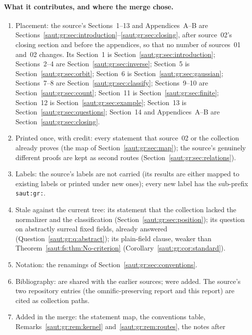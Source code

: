 \documentclass[11pt]{article}
\theoremstyle{definition}
\theoremstyle{remark}
\numberwithin{equation}{section}
\begin{document}
\paragraph{What it contributes, and where the merge chose.}
\begin{enumerate}[label=(\arabic*)]
\item Placement: the source's Sections~1--13 and Appendices~A--B are
Sections~\ref{saut:gr:sec:introduction}--\ref{saut:gr:sec:closing}, after source~02's
closing section and before the appendices, so that no number of sources~01 and~02
changes. Its Section~1 is Section~\ref{saut:gr:sec:introduction}; Sections~2--4 are
Section~\ref{saut:gr:sec:inverse}; Section~5 is Section~\ref{saut:gr:sec:orbit};
Section~6 is Section~\ref{saut:gr:sec:gaussian}; Sections~7--8 are
Section~\ref{saut:gr:sec:classify}; Sections~9--10 are Section~\ref{saut:gr:sec:count};
Section~11 is Section~\ref{saut:gr:sec:finite}; Section~12 is
Section~\ref{saut:gr:sec:example}; Section~13 is Section~\ref{saut:gr:sec:questions};
Section~14 and Appendices~A--B are Section~\ref{saut:gr:sec:closing}.
\item Printed once, with credit: every statement that source~02 or the collection
already proves (the map of Section~\ref{saut:gr:sec:map}); the source's genuinely
different proofs are kept as second routes (Section~\ref{saut:gr:sec:relations}).
\item Labels: the source's labels are not carried (its results are either mapped to
existing labels or printed under new ones); every new label has the sub-prefix
\texttt{saut:gr:}.
\item Stale against the current tree: its statement that the collection lacked the
normalizer and the classification (Section~\ref{saut:gr:sec:position}); its question on
abstractly surreal fixed fields, already answered (Question~\ref{saut:gr:q:abstract}); its
plain-field clause, weaker than Theorem~\ref{saut:fs:thm:No-criterion}
(Corollary~\ref{saut:gr:cor:standard}).
\item Notation: the renamings of Section~\ref{saut:gr:sec:conventions}.
\item Bibliography: \cite{BKKS,KS,KKS,Conrad} are shared with the earlier sources;
\cite{StacksClosure,StacksTranscendence} were added. The source's two repository
entries (the omnific-preserving report and this report) are cited as collection paths.
\item Added in the merge: the statement map, the conventions table,
Remarks~\ref{saut:gr:rem:kernel} and~\ref{saut:gr:rem:routes}, the notes after

\end{enumerate}
\end{document}
